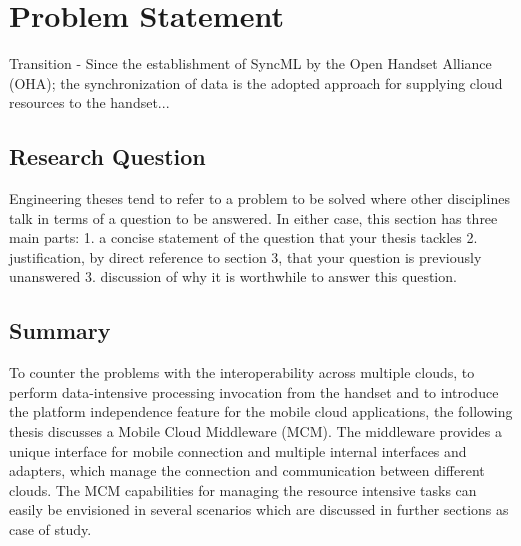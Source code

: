 
\chapter{Problem Statement} %


Transition - Since the establishment of SyncML by the Open Handset Alliance (OHA); the synchronization of data is the adopted approach for supplying cloud resources to the handset... 




\ifpdf
    \graphicspath{{X/figures/PNG/}{X/figures/PDF/}{X/figures/}}
\else
    \graphicspath{{X/figures/EPS/}{X/figures/}}
\fi


\section{Research Question}
Engineering theses tend to refer to a problem to be solved where other disciplines talk in terms of a question to be answered. In either case, this section has three main parts: 
1. a concise statement of the question that your thesis tackles 
2. justification, by direct reference to section 3, that your question is previously unanswered
3. discussion of why it is worthwhile to answer this question. 




\section{Summary}
To counter the problems with the interoperability across multiple clouds, to perform data-intensive processing invocation from the handset and to introduce the platform independence feature for the mobile cloud applications, the following thesis discusses a Mobile Cloud Middleware (MCM). The middleware provides a unique interface for mobile connection and multiple internal interfaces and adapters, which manage the connection and communication between different clouds. The MCM capabilities for managing the resource intensive tasks can easily be envisioned in several scenarios which are discussed in further sections as case of study. 






